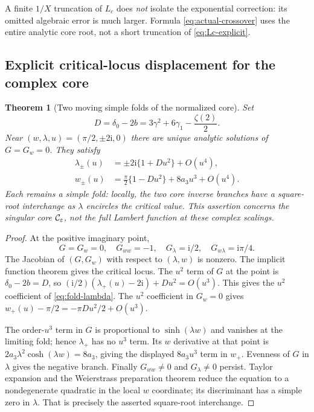 \documentclass[11pt,a4paper]{article}
\numberwithin{equation}{section}
\newtheorem{theorem}{Theorem}[section]
\theoremstyle{definition}\newtheorem{definition}[theorem]{Definition}
\theoremstyle{remark}\newtheorem{remark}[theorem]{Remark}
\newcommand{\eps}{\varepsilon}
\newcommand{\ii}{\mathrm i}
\begin{document}
A finite $1/X$ truncation of $L_c$ does \emph{not} isolate the
exponential correction: its omitted algebraic error is much larger.
Formula \eqref{eq:actual-crossover} uses the entire analytic core root,
not a short truncation of \eqref{eq:Lc-explicit}.

\subsection{Explicit critical-locus displacement for the complex core}
\begin{theorem}[Two moving simple folds of the normalized core]
\label{thm:folds}
Set
\begin{equation}\label{eq:Dfold}
 D=\delta_0-2b=3\gamma^2+6\gamma_1-\frac{\zeta(2)}2.
\end{equation}
Near $(w,\lambda,u)=(\pi/2,\pm2\ii,0)$ there are unique analytic
solutions of $G=G_w=0$. They satisfy
\begin{align}
 \lambda_\pm(u)&=\pm2\ii\{1+Du^2\}+O(u^4),
 \label{eq:fold-lambda}\\
 w_\pm(u)&=\frac\pi2\{1-Du^2\}+8a_3u^3+O(u^4).
 \label{eq:fold-w}
\end{align}
Each remains a simple fold: locally, the two core inverse branches have
a square-root interchange as $\lambda$ encircles the critical value.
This assertion concerns the singular core $\CC_\eps$, not the full
Lambert function at these complex scalings.
\end{theorem}
\begin{proof}
At the positive imaginary point,
\[
 G=G_w=0,\quad G_{ww}=-1,\quad G_\lambda=\ii/2,
 \quad G_{w\lambda}=\ii\pi/4.
\]
The Jacobian of $(G,G_w)$ with respect to $(\lambda,w)$ is
nonzero. The implicit function theorem gives the critical locus.
The $u^2$ term of $G$ at the point is $\delta_0-2b=D$, so
$(\ii/2)(\lambda_+(u)-2\ii)+Du^2=O(u^3)$.
This gives the $u^2$ coefficient of \eqref{eq:fold-lambda}.
The $u^2$ coefficient in $G_w=0$ gives
$w_+(u)-\pi/2=-\pi Du^2/2+O(u^3)$.

The order-$u^3$ term in $G$ is proportional to
$\sinh(\lambda w)$ and vanishes at the limiting fold; hence
$\lambda_+$ has no $u^3$ term. Its $w$ derivative at that point
is $2a_3\lambda^2\cosh(\lambda w)=8a_3$, giving the displayed
$8a_3u^3$ term in $w_+$. Evenness of $G$ in $\lambda$ gives the
negative branch. Finally $G_{ww}\ne0$ and $G_\lambda\ne0$
persist. Taylor expansion and the Weierstrass preparation theorem
reduce the equation to a nondegenerate quadratic in the local $w$
coordinate; its discriminant has a simple zero in $\lambda$.
That is precisely the asserted square-root interchange.
\end{proof}
\end{document}
